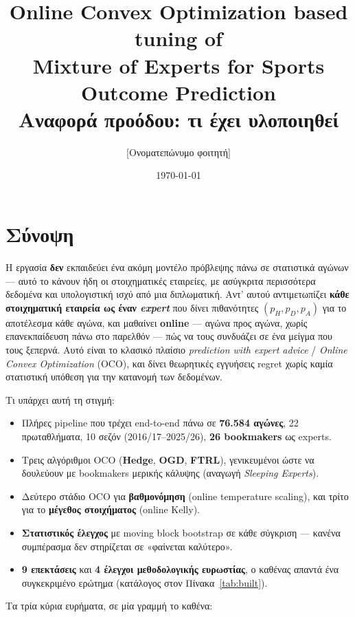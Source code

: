 \documentclass[11pt,a4paper]{article}
\title{\textbf{Online Convex Optimization based tuning of\\ Mixture of Experts for Sports Outcome Prediction}\\[8pt]
\large Αναφορά προόδου: τι έχει υλοποιηθεί}
\author{[Ονοματεπώνυμο φοιτητή]}
\date{\today}
\renewcommand{\_}{\oldunderscore\allowbreak}
\begin{document}
\maketitle

\section{Σύνοψη}

Η εργασία \textbf{δεν} εκπαιδεύει ένα ακόμη μοντέλο πρόβλεψης πάνω σε στατιστικά αγώνων ---
αυτό το κάνουν ήδη οι στοιχηματικές εταιρείες, με ασύγκριτα περισσότερα δεδομένα και
υπολογιστική ισχύ από μια διπλωματική. Αντ' αυτού αντιμετωπίζει \textbf{κάθε στοιχηματική
εταιρεία ως έναν \emph{expert}} που δίνει πιθανότητες $(p_H, p_D, p_A)$ για το αποτέλεσμα
κάθε αγώνα, και μαθαίνει \textbf{online} --- αγώνα προς αγώνα, χωρίς επανεκπαίδευση πάνω στο
παρελθόν --- πώς να τους συνδυάζει σε ένα μείγμα που τους ξεπερνά. Αυτό είναι το κλασικό
πλαίσιο \emph{prediction with expert advice} / \emph{Online Convex Optimization} (OCO), και
δίνει θεωρητικές εγγυήσεις regret χωρίς καμία στατιστική υπόθεση για την κατανομή των
δεδομένων.

Τι υπάρχει αυτή τη στιγμή:

\begin{itemize}
  \item Πλήρες pipeline που τρέχει end-to-end πάνω σε \textbf{76.584 αγώνες}, 22
        πρωταθλήματα, 10 σεζόν (2016/17--2025/26), \textbf{26 bookmakers} ως experts.
  \item Τρεις αλγόριθμοι OCO (\textbf{Hedge}, \textbf{OGD}, \textbf{FTRL}), γενικευμένοι
        ώστε να δουλεύουν με bookmakers μερικής κάλυψης (αναγωγή \emph{Sleeping Experts}).
  \item Δεύτερο στάδιο OCO για \textbf{βαθμονόμηση} (online temperature scaling), και τρίτο
        για το \textbf{μέγεθος στοιχήματος} (online Kelly).
  \item \textbf{Στατιστικός έλεγχος} με moving block bootstrap σε κάθε σύγκριση --- κανένα
        συμπέρασμα δεν στηρίζεται σε «φαίνεται καλύτερο».
  \item \textbf{9 επεκτάσεις} και \textbf{4 έλεγχοι μεθοδολογικής ευρωστίας}, ο καθένας
        απαντά ένα συγκεκριμένο ερώτημα (κατάλογος στον Πίνακα~\ref{tab:built}).
\end{itemize}

Τα τρία κύρια ευρήματα, σε μία γραμμή το καθένα:
\end{document}
